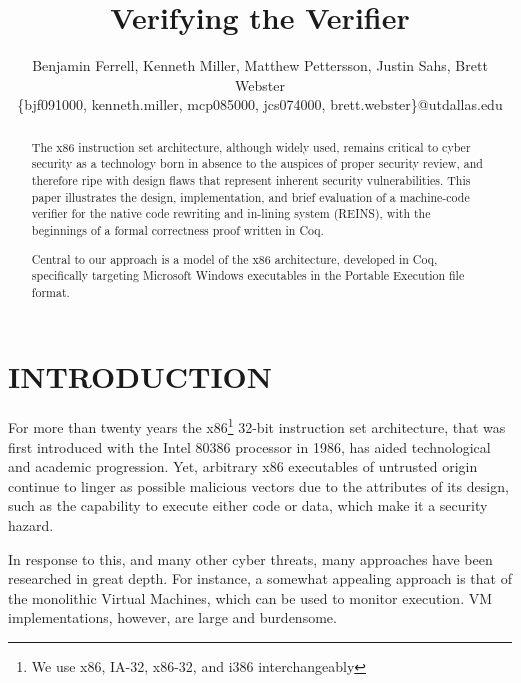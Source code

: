 \documentclass[conference]{IEEEtran}
\newcounter{change}[section]
\begin{document}
\title{Verifying the Verifier}

\author{
{Benjamin Ferrell, Kenneth Miller, Matthew Pettersson, Justin Sahs, Brett Webster}\\
\{bjf091000, kenneth.miller,  mcp085000, jcs074000,  brett.webster\}@utdallas.edu
}

\maketitle

\begin{abstract}

The x86 instruction set architecture, although widely used, remains critical to cyber security as a technology born in absence to the auspices of proper security review, and therefore ripe with design flaws that represent inherent security vulnerabilities.
This paper illustrates the design, implementation, and brief evaluation of a machine-code verifier for the native code rewriting and in-lining system (REINS)\cite{wartell12acsac}, with the beginnings of a formal correctness proof written in Coq\cite{Coq:Misc}.  

Central to our approach is a model of the x86 architecture\cite{MorrisettTTTG12}, developed in Coq, specifically targeting Microsoft Windows executables in the Portable Execution file format. 

\end{abstract}

\section{INTRODUCTION}

For more than twenty years the x86\footnote{We use x86, IA-32, x86-32, and i386 interchangeably} 32-bit instruction set architecture, that was first introduced with the Intel 80386 processor in 1986, has aided technological and academic progression.  
Yet, arbitrary x86 executables of untrusted origin continue to linger as possible malicious vectors due to the attributes of its design, such as the capability to execute either code or data, which make it a security hazard.

In response to this, and many other cyber threats, many approaches have been researched in great depth.
For instance, a somewhat appealing approach is that of the monolithic Virtual Machines, which can be used to monitor execution.  
VM implementations, however, are large and burdensome.    
\end{document}
